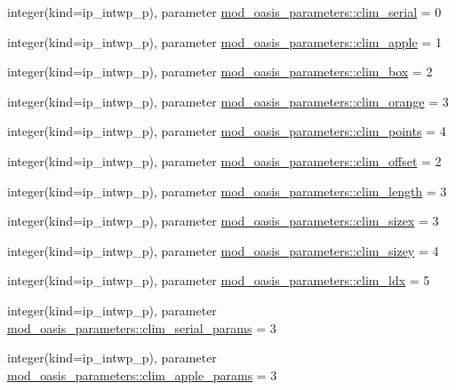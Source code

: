 \begin{DoxyCompactItemize}
\item 
integer(kind=ip\+\_\+intwp\+\_\+p), parameter \hyperlink{namespacemod__oasis__parameters_a5c410369e763f9156d0ce1c82e866265}{mod\+\_\+oasis\+\_\+parameters\+::clim\+\_\+serial} = 0
\item 
integer(kind=ip\+\_\+intwp\+\_\+p), parameter \hyperlink{namespacemod__oasis__parameters_a3cfd98fdd1c2fac653b182454c87f4aa}{mod\+\_\+oasis\+\_\+parameters\+::clim\+\_\+apple} = 1
\item 
integer(kind=ip\+\_\+intwp\+\_\+p), parameter \hyperlink{namespacemod__oasis__parameters_a9a8b38629274e3a38a37f329ce9d2aa2}{mod\+\_\+oasis\+\_\+parameters\+::clim\+\_\+box} = 2
\item 
integer(kind=ip\+\_\+intwp\+\_\+p), parameter \hyperlink{namespacemod__oasis__parameters_a17c74cc8141b595e448588b1add0f6bf}{mod\+\_\+oasis\+\_\+parameters\+::clim\+\_\+orange} = 3
\item 
integer(kind=ip\+\_\+intwp\+\_\+p), parameter \hyperlink{namespacemod__oasis__parameters_aa9d90a3d7d5b21d2081a578dfea42fd4}{mod\+\_\+oasis\+\_\+parameters\+::clim\+\_\+points} = 4
\item 
integer(kind=ip\+\_\+intwp\+\_\+p), parameter \hyperlink{namespacemod__oasis__parameters_a4cd07733eaf5d8c8148986c0c4217772}{mod\+\_\+oasis\+\_\+parameters\+::clim\+\_\+offset} = 2
\item 
integer(kind=ip\+\_\+intwp\+\_\+p), parameter \hyperlink{namespacemod__oasis__parameters_a984896e821cbbb8c4a91e86ff19d54de}{mod\+\_\+oasis\+\_\+parameters\+::clim\+\_\+length} = 3
\item 
integer(kind=ip\+\_\+intwp\+\_\+p), parameter \hyperlink{namespacemod__oasis__parameters_a4fb35a666ab4cec927a2ae9244535cb0}{mod\+\_\+oasis\+\_\+parameters\+::clim\+\_\+sizex} = 3
\item 
integer(kind=ip\+\_\+intwp\+\_\+p), parameter \hyperlink{namespacemod__oasis__parameters_a206910560c246db3404224a04cfd4319}{mod\+\_\+oasis\+\_\+parameters\+::clim\+\_\+sizey} = 4
\item 
integer(kind=ip\+\_\+intwp\+\_\+p), parameter \hyperlink{namespacemod__oasis__parameters_a3407c11054d24782182c649307808e47}{mod\+\_\+oasis\+\_\+parameters\+::clim\+\_\+ldx} = 5
\item 
integer(kind=ip\+\_\+intwp\+\_\+p), parameter \hyperlink{namespacemod__oasis__parameters_a03d86f9ce8a47debbd60515fa94e5b11}{mod\+\_\+oasis\+\_\+parameters\+::clim\+\_\+serial\+\_\+params} = 3
\item 
integer(kind=ip\+\_\+intwp\+\_\+p), parameter \hyperlink{namespacemod__oasis__parameters_a9c8bcc73b1daadd3dd4814b2dfe5e649}{mod\+\_\+oasis\+\_\+parameters\+::clim\+\_\+apple\+\_\+params} = 3

\end{DoxyCompactItemize}
